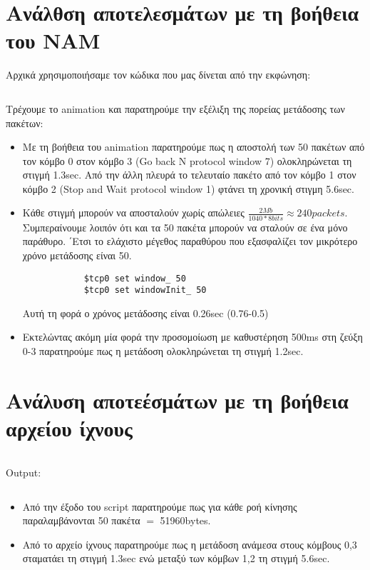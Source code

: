 \documentclass[a4paper,9pt]{article}
\begin{document}
\def\thesection {\Roman{section}.}



\section*{Aνάλθση αποτελεσμάτων με τη βοήθεια του NAM}
Αρχικά χρησιμοποιήσαμε τον κώδικα που μας δίνεται από την εκφώνηση:

\inputminted[fontsize=\footnotesize]{tcl}{files/ex4_1.tcl}

Τρέχουμε το animation και παρατηρούμε την εξέλιξη της πορείας μετάδοσης των
πακέτων:
\begin{itemize}
    \item Με τη βοήθεια του animation παρατηρούμε πως η αποστολή των 50
        πακέτων από τον κόμβο 0 στον κόμβο 3 (Go back N protocol window 7) ολοκληρώνεται τη
        στιγμή 1.3sec. Από την άλλη πλευρά το τελευταίο πακέτο από τον κόμβο 1
        στον κόμβο 2 (Stop and Wait protocol window 1) φτάνει τη χρονική στιγμη
        5.6sec.
    \item Κάθε στιγμή μπορούν να αποσταλούν χωρίς απώλειες
        $\frac{2Mb}{1040*8bits}\approx240packets$.  Συμπεραίνουμε λοιπόν ότι και
        τα 50 πακέτα μπορούν να σταλούν σε ένα μόνο παράθυρο. ΄Ετσι το ελάχιστο μέγεθος παραθύρου που εξασφαλίζει τον
        μικρότερο χρόνο μετάδοσης είναι 50.
        \begin{verbatim}
            $tcp0 set window_ 50
            $tcp0 set windowInit_ 50
        \end{verbatim}
        Αυτή τη φορά ο χρόνος μετάδοσης είναι 0.26sec (0.76-0.5)
    \item Εκτελώντας ακόμη μία φορά την προσομοίωση με καθυστέρηση 500ms στη
        ζεύξη 0-3 παρατηρούμε πως η μετάδοση ολοκληρώνεται τη στιγμή 1.2sec.
\end{itemize}

\section*{Ανάλυση αποτεέσμάτων με τη βοήθεια αρχείου ίχνους}
\inputminted[fontsize=\footnotesize]{awk}{files/script_1.awk}

\noindent Output:
\inputminted[fontsize=\footnotesize]{text}{files/awk.out}

\begin{itemize}
    \item Από την έξοδο του script παρατηρούμε πως για κάθε ροή κίνησης
        παραλαμβάνονται 50 πακέτα $=$ 51960bytes. 
    \item Από το αρχείο ίχνους παρατηρούμε πως η μετάδοση ανάμεσα στους
        κόμβους 0,3 σταματάει τη στιγμή 1.3sec ενώ μεταξύ των κόμβων 1,2 τη
        στιγμή 5.6sec.
\end{itemize}
\end{document}
